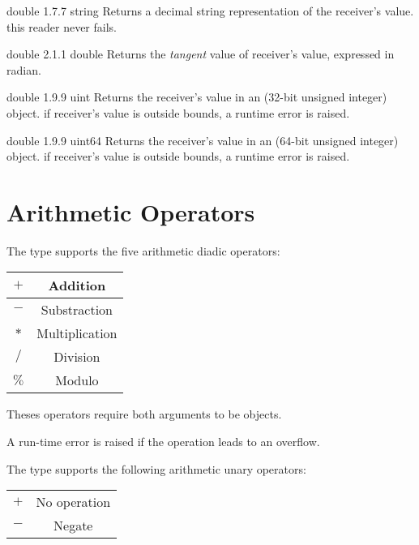{double}
{1.7.7}
{string}
{Returns a decimal string representation of the receiver's value.}
{this reader never fails.}




{double}
{2.1.1}
{double}
{Returns the \emph{tangent} value of receiver's value, expressed in radian.}
{}







{double}
{1.9.9}
{uint}
{Returns the receiver's value in an  (32-bit unsigned integer) object.}
{if receiver's value is outside  bounds, a runtime error is raised.}





{double}
{1.9.9}
{uint64}
{Returns the receiver's value in an  (64-bit unsigned integer) object.}
{if receiver's value is outside  bounds, a runtime error is raised.}




\section{Arithmetic Operators}

The  type supports the five arithmetic diadic operators:\newline

\begin{tabular}{|c|c|}
\hline
$+$ & Addition \\
\hline
$-$ & Substraction \\
\hline
$*$ & Multiplication \\
\hline
$/$ & Division \\
\hline
$\%$ & Modulo \\
\hline
\end{tabular}

Theses operators require both arguments to be  objects.\newline

A run-time error is raised if the operation leads to an overflow.

The  type supports the following arithmetic unary operators:\newline

\begin{tabular}{|c|c|}
\hline
$+$ & No operation \\
$-$ & Negate \\
\hline
\end{tabular}

